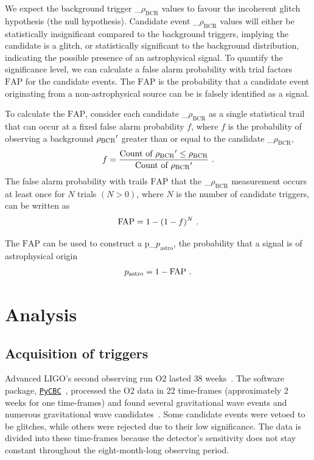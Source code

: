 \documentclass[%
 nofootinbib,
 amsmath,amssymb,
 aps,
 twocolumn
]{revtex4-2}
\newcommand{\pycbc}{{\sc \href{https://pycbc.org/}{\texttt{PyCBC}}}\xspace}
\newcommand{\fancytext}[1]{{\relax\ifmmode#1\else $#1$\fi}\xspace}
\newcommand{\mathcmd}[1]{{\sc \relax\ifmmode#1\else $#1$\fi}\xspace}
\newcommand{\bcr}{\mathcmd{\rho_\text{BCR}}}
\newcommand{\fap}{\mathcmd{\text{FAP}}}
\newcommand{\pastro}{\fancytext{p_\text{astro}}}
\begin{document}
We expect the background trigger \bcr values to favour the incoherent glitch hypothesis (the null hypothesis). Candidate event \bcr values will either be statistically insignificant compared to the background triggers, implying the candidate is a glitch, or statistically significant to the background distribution, indicating the possible presence of an astrophysical signal. To quantify the significance level, we can calculate a false alarm probability with trial factors \fap for the candidate events. The \fap is the probability that a candidate event originating from a non-astrophysical source can be is falsely identified as a signal.

To calculate the \fap, consider each candidate \bcr as a single statistical trail that can occur at a fixed false alarm probability $f$, where $f$ is the probability of observing a background $\bcr'$ greater than or equal to the candidate \bcr,
\begin{equation}
    f = \frac{\text{Count of } \bcr' \leq \bcr}{\text{Count of } \bcr'} \ .
\end{equation}
The false alarm probability with trails \fap that the \bcr measurement occurs at least once for $N$ trials $(N > 0)$, where $N$ is the number of candidate triggers, can be written as
\begin{equation}
    \fap = 1 - (1-f)^N \ .
\end{equation}

The \fap can be used to construct a \pastro, the probability that a signal is of astrophysical origin~\cite{pastro_1,pastro_2,pastro_3}
\begin{equation}
    \pastro = 1 -  \fap \ .
\end{equation}


\section{Analysis}\label{sec:Analysis}

\subsection{Acquisition of triggers}
Advanced LIGO's second observing run O2 lasted $38$ weeks~\cite{GWOSC}. The software package, \pycbc~\cite{pycbc_code}, processed the O2 data in 22 time-frames (approximately 2 weeks for one time-frames) and found several gravitational wave events and numerous gravitational wave candidates~\cite{pycbc_og0, pycbc_og1, pycbc_og2, pycbc_og3, pycbc_og4, pycbc_og5, pycbc_og6}. Some candidate events were vetoed to be glitches, while others were rejected due to their low significance. The data is divided into these time-frames because the detector's sensitivity does not stay constant throughout the eight-month-long observing period.
\end{document}
